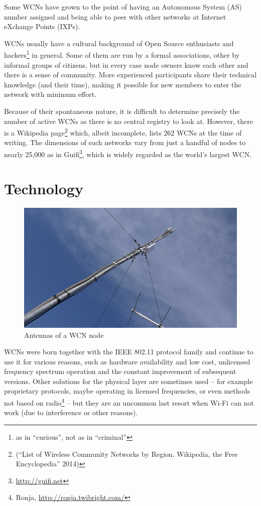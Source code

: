 \documentclass[oneside,openany]{memoir}
\begin{document}
Some WCNs have grown to
the point of having an Autonomous System (AS) number assigned and being able to
peer with other networks at Internet eXchange Points (IXPs).

WCNs usually have a cultural background of Open Source enthusiasts and
hackers\footnote{as in ``curious'', not as in ``criminal''} in general.
Some of them are run by a formal associations, other by informal groups
of citizens, but in every case node owners know each other and there is
a sense of community. More experienced participants share their
technical knowledge (and their time), making it possible for new members
to enter the network with minimum effort.

Because of their spontaneous nature, it is difficult to
determine precisely the number of active WCNs as there is no central
registry to look at. However, there is a Wikipedia page\footnote{(``List
  of Wireless Community Networks by Region. Wikipedia, the Free
  Encyclopedia'' 2014)} which, albeit incomplete, lists 262 WCNs at the
time of writing. The dimensions of such networks vary from just a
handful of nodes to nearly 25,000 as in Guifi\footnote{\url{http://guifi.net}},
which is widely regarded as the world's largest WCN.

\section{Technology}\label{technology}

\begin{figure}[htbp]
\centering
\includegraphics{images/ninux_node.png}
\caption{Antennas of a WCN node}
\end{figure}

WCNs were born together with the IEEE 802.11 protocol family and
continue to use it for various reasons, such as hardware availability
and low cost, unlicensed frequency spectrum operation and the constant
improvement of subsequent versions. Other solutions for the physical
layer are sometimes used -- for example proprietary protocols, maybe
operating in licensed frequencies, or even methods not based on
radio\footnote{Ronja, \url{http://ronja.twibright.com/}} -- but they are
an uncommon last resort when Wi-Fi can not work (due to interference or
other reasons).
\end{document}
